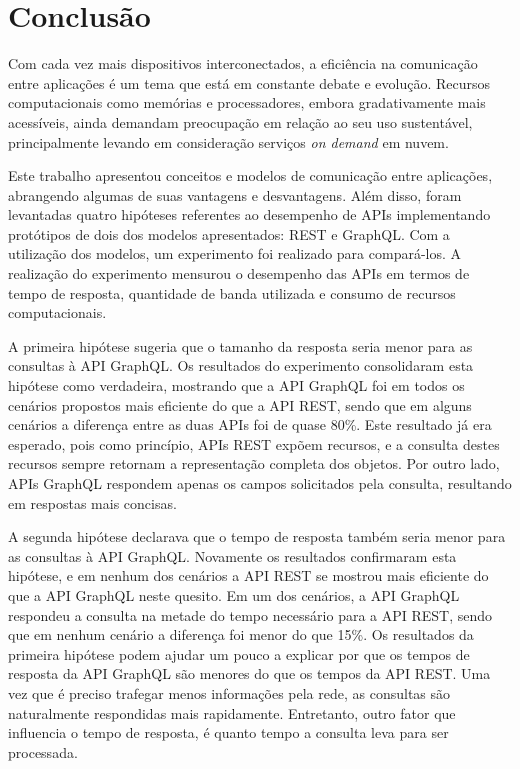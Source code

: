 \chapter{Conclusão}

Com cada vez mais dispositivos interconectados, a eficiência na comunicação entre aplicações é um tema que está em constante debate e evolução. Recursos computacionais como memórias e processadores, embora gradativamente mais acessíveis, ainda demandam preocupação em relação ao seu uso sustentável, principalmente levando em consideração serviços \textit{on demand} em nuvem.

Este trabalho apresentou conceitos e modelos de comunicação entre aplicações, abrangendo algumas de suas vantagens e desvantagens. Além disso, foram levantadas quatro hipóteses referentes ao desempenho de APIs implementando protótipos de dois dos modelos apresentados: REST e GraphQL. Com a utilização dos modelos, um experimento foi realizado para compará-los. A realização do experimento mensurou o desempenho das APIs em termos de tempo de resposta, quantidade de banda utilizada e consumo de recursos computacionais.

A primeira hipótese sugeria que o tamanho da resposta seria menor para as consultas à API GraphQL. Os resultados do experimento consolidaram esta hipótese como verdadeira, mostrando que a API GraphQL foi em todos os cenários propostos mais eficiente do que a API REST, sendo que em alguns cenários a diferença entre as duas APIs foi de quase 80\%. Este resultado já era esperado, pois como princípio, APIs REST expõem recursos, e a consulta destes recursos sempre retornam a representação completa dos objetos. Por outro lado, APIs GraphQL respondem apenas os campos solicitados pela consulta, resultando em respostas mais concisas.

A segunda hipótese declarava que o tempo de resposta também seria menor para as consultas à API GraphQL. Novamente os resultados confirmaram esta hipótese, e em nenhum dos cenários a API REST se mostrou mais eficiente do que a API GraphQL neste quesito. Em um dos cenários, a API GraphQL respondeu a consulta na metade do tempo necessário para a API REST, sendo que em nenhum cenário a diferença foi menor do que 15\%. Os resultados da primeira hipótese podem ajudar um pouco a explicar por que os tempos de resposta da API GraphQL são menores do que os tempos da API REST. Uma vez que é preciso trafegar menos informações pela rede, as consultas são naturalmente respondidas mais rapidamente. Entretanto, outro fator que influencia o tempo de resposta, é quanto tempo a consulta leva para ser processada.

